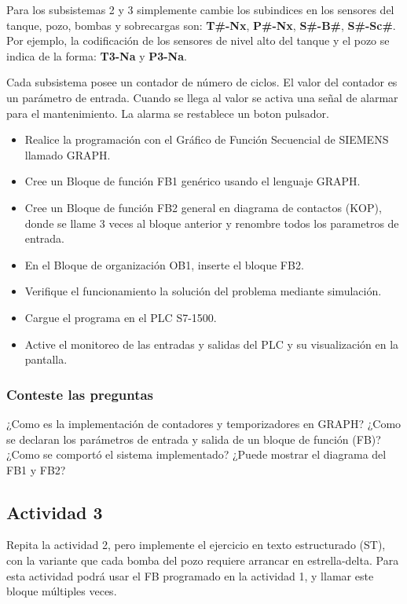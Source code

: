 Para los subsistemas 2 y 3 simplemente cambie los subindices en los sensores del tanque, pozo, bombas y sobrecargas son: \textbf{T\#-Nx}, \textbf{P\#-Nx}, \textbf{S\#-B\#}, \textbf{S\#-Sc\#}. Por ejemplo, la codificación de los sensores de nivel alto del tanque y el pozo se indica de la forma: \textbf{T3-Na} y \textbf{P3-Na}.

Cada subsistema posee un contador de número de ciclos. El valor del contador es un parámetro de entrada. Cuando se llega al valor se activa una señal de alarmar para el mantenimiento. La alarma se restablece un boton pulsador.

\begin{itemize}
	\item Realice la programación con el Gráfico de Función Secuencial de SIEMENS llamado GRAPH.
	\item Cree un Bloque de función FB1 genérico  usando el lenguaje GRAPH.
	\item Cree un Bloque de  función FB2 general en diagrama de contactos (KOP), donde se llame 3 veces al bloque anterior y  renombre todos los parametros de entrada.
	\item En el Bloque de organización OB1, inserte el bloque FB2.
	\item Verifique el funcionamiento  la solución del problema mediante simulación.
	\item Cargue el programa en el PLC S7-1500.
	\item Active el monitoreo de las entradas y salidas del PLC y su visualización en la pantalla. 
	
\end{itemize}

\subsubsection{Conteste las preguntas}

¿Como es la implementación de contadores y temporizadores en GRAPH?
¿Como se declaran los parámetros de entrada  y salida de un bloque de función (FB)?
¿Como se comportó el sistema implementado? ¿Puede mostrar el diagrama del FB1 y FB2?

\subsection{Actividad 3}

Repita la actividad 2, pero implemente el ejercicio en texto estructurado (ST), con la variante que cada bomba del pozo requiere arrancar en estrella-delta.
Para esta actividad podrá usar el FB programado en la actividad 1, y llamar este bloque múltiples veces. 
 

